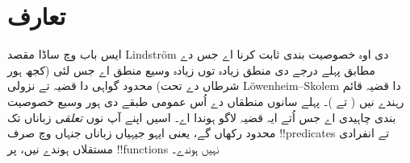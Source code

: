 \documentclass[../../../include/open-logic-section]{subfiles}
\begin{document}
\section{تعارف}

ایس باب وچ ساڈا مقصد Lindstr\"om دی اوہ خصوصیت بندی ثابت کرنا اے جس
دے مطابق پہلے درجے دی منطق زیادہ توں زیادہ وسیع منطق اے جس لئی (کجھ ہور
شرطاں دے تحت) محدود گواہی دا قضیہ تے نزولی L\"owenheim--Skolem دا
قضیہ قائم رہندے نیں
( تے
)۔ پہلے سانوں منطقاں دے
اُس عمومی طبقے دی ہور وسیع خصوصیت بندی چاہیدی اے جس اُتے ایہ
قضیہ لاگو ہوندا اے۔ اسیں اپنے آپ نوں \emph{تعلقی} زباناں تک
محدود رکھاں گے، یعنی ایہو جیہیاں زباناں جنہاں وچ صرف
!!{predicate}s تے انفرادی مستقلاں ہوندے نیں، پر !!{function}s
نہیں ہوندے۔
\end{document}
